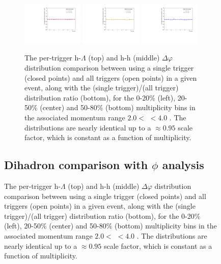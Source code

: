 \begin{figure}
\begin{figure}[ht]
    \includegraphics[width=0.32\textwidth]{figures/analysis/singletrigger_ratio_0_20.pdf}
    \includegraphics[width=0.32\textwidth]{figures/analysis/singletrigger_ratio_20_50.pdf}
    \includegraphics[width=0.32\textwidth]{figures/analysis/singletrigger_ratio_50_80.pdf}
    \caption{The per-trigger h-$\Lambda$ (top) and h-h (middle) $\Delta\varphi$ distribution comparison between using a single trigger (closed points) and all triggers (open points) in a given event, along with the (single trigger)/(all trigger) distribution ratio (bottom), for the 0-20\% (left), 20-50\% (center) and 50-80\% (bottom) multiplicity bins in the associated momentum range $2.0 <$ \pt $< 4.0$ \GeVc. The distributions are nearly identical up to a $\approx 0.95$ scale factor, which is constant as a function of multiplicity.}
    \label{fig:single_trigger_comp}
\end{figure}

\clearpage

\subsection{Dihadron comparison with $\phi$ analysis}
\label{sec:dihadron_comparison}


\end{figure}
